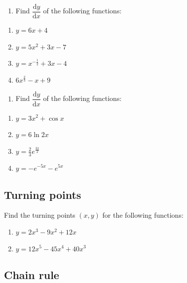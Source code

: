 \documentclass[
]{book}
\providecommand{\tightlist}{%
  \setlength{\itemsep}{0pt}\setlength{\parskip}{0pt}}
\begin{document}
\begin{enumerate}
\def\labelenumi{\arabic{enumi}.}
\tightlist
\item
  Find \(\dfrac{\textrm{d}y}{\textrm{d}x}\) of the following functions:
\end{enumerate}

\begin{enumerate}
\def\labelenumi{\alph{enumi}.}
\tightlist
\item
  \(y = 6x + 4\)
\item
  \(y = 5x^2+ 3x-7\)
\item
  \(y = x^{-\frac{1}{2}}+ 3x-4\)
\item
  \(6x^{\frac{2}{3}}-x+9\)
\end{enumerate}

\begin{enumerate}
\def\labelenumi{\arabic{enumi}.}
\setcounter{enumi}{1}
\tightlist
\item
  Find \(\dfrac{\textrm{d}y}{\textrm{d}x}\) of the following functions:
\end{enumerate}

\begin{enumerate}
\def\labelenumi{\alph{enumi}.}
\tightlist
\item
  \(y = 3x^2 + \cos x\)
\item
  \(y = 6 \ln 2x\)
\item
  \(y = \frac{2}{3}e^{\frac{3x}{2}}\)
\item
  \(y = -e^{-5x}-e^{5x}\)
\end{enumerate}

\hypertarget{turning-points}{%
\subsection{Turning points}\label{turning-points}}

Find the turning points \((x,y)\) for the following functions:

\begin{enumerate}
\def\labelenumi{\arabic{enumi}.}
\tightlist
\item
  \(y = 2x^3 - 9x^2 + 12x\)
\item
  \(y = 12x^5 - 45x^4 + 40x^3\)
\end{enumerate}

\hypertarget{chain-rule}{%
\subsection{Chain rule}\label{chain-rule}}
\end{document}
